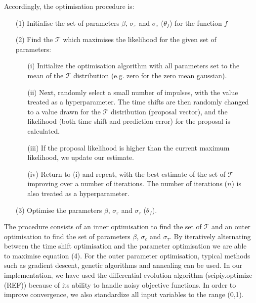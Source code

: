 \documentclass[11pt]{amsart}
\begin{document}
Accordingly, the optimisation procedure is:
\vspace{5mm} %

\begin{enumerate}
    \item [(1)] Initialise the set of parameters $\beta$, $\sigma_{\varepsilon}$ and $\sigma_{\tau}$ ($\theta_{f}$) for the function $f$
    \item [(2)] Find the $\mathcal{T}$ which maximises the likelihood for the given set of parameters:
        \begin{enumerate} 
            \item[(i)] Initialize the optimisation algorithm with all parameters set to the mean of the $\mathcal{T}$ distribution (e.g. zero for the zero mean gaussian). 
            \item[(ii)] Next, randomly select a small number of impulses, with the value treated as a hyperparameter. The time shifts are then randomly changed to a value drawn for the $\mathcal{T}$ distribution (proposal vector), and the likelihood (both time shift and prediction error) for the proposal is calculated. 
            \item[(iii)] If the proposal likelihood is higher than the current maximum likelihood, we update our estimate.
            \item [(iv)] Return to (i) and repeat, with the best estimate of the set of $\mathcal{T}$ improving over a number of iterations. The number of iterations ($n$) is also treated as a hyperparameter.
        \end{enumerate} 
    \item [(3)] Optimise the parameters $\beta$, $\sigma_{\varepsilon}$ and $\sigma_{\tau}$ ($\theta_{f}$).

\end{enumerate}
\vspace{5mm} %
The procedure consists of an inner optimisation to find the set of $\mathcal{T}$ and an outer optimisation to find the set of parameters $\beta$, $\sigma_{\varepsilon}$ and $\sigma_{\tau}$. 
By iteratively alternating between the time shift optimisation and the parameter optimisation we are able to maximise equation (4). 
For the outer parameter optimisation, typical methods such as gradient descent, genetic algorithms and annealing can be used.  In our implementation, we have used the differential evolution algorithm (scipiy.optimize (REF)) because of its ability to handle noisy objective functions. In order to improve convergence, we also standardize all input variables to the range (0,1).
\end{document}
